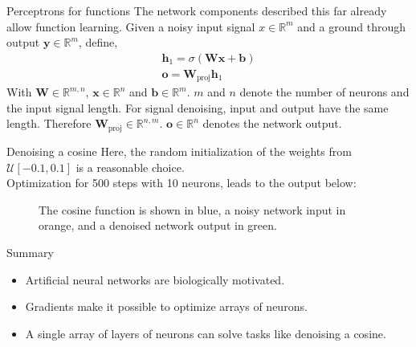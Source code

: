 \documentclass{beamer}
\begin{document}
    \begin{frame}{Perceptrons for functions}
      The network components described this far already allow function learning.
      Given a noisy input signal $x \in \mathbb{R}^{m}$ and a ground through output $\mathbf{y} \in \mathbb{R}^m$,
      define,
      \begin{align}
        \mathbf{h}_1 = \sigma(\mathbf{W}\mathbf{x} + \mathbf{b}) \\
        \mathbf{o} = \mathbf{W}_{\text{proj}}\mathbf{h}_1
      \end{align}
      With $\mathbf{W} \in \mathbb{R}^{m,n}$, $\mathbf{x} \in \mathbb{R}^{n}$ and $\mathbf{b} \in \mathbb{R}^{m}$.
      $m$ and $n$ denote the number of neurons and the input signal length.
      For signal denoising, input and output have the same length.
      Therefore $\mathbf{W}_{\text{proj}} \in \mathbb{R}^{n,m}$.
      $\mathbf{o} \in \mathbb{R}^{n}$ denotes the network output.
    \end{frame}


    \begin{frame}{Denoising a cosine}
			Here, the random initialization of the weights from $\mathcal{U}[-0.1, 0.1]$ is a reasonable choice.\\
      Optimization for 500 steps with 10 neurons, leads to the output below:
      \begin{figure}
        
        \caption{The cosine function is shown in blue, a noisy network input in orange, and a denoised network output in green.}
        \end{figure}
    \end{frame}

    \begin{frame}{Summary}
      \begin{itemize}
        \item Artificial neural networks are biologically motivated.
        \item Gradients make it possible to optimize arrays of neurons.
        \item A single array of layers of neurons can solve tasks like denoising a cosine.
      \end{itemize}
    \end{frame}
\end{document}
